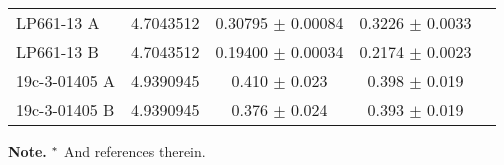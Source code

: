 \documentclass[fleqn,usenatbib]{mnras}
\begin{document}
\begin{table*}
\begin{center}
\begin{tabular}{lcccc}
LP661-13 A & 4.7043512 & 0.30795 $\pm$ 0.00084 & 0.3226 $\pm$ 0.0033 & \cite{Dittmann17} \\ %
LP661-13 B & 4.7043512 & 0.19400 $\pm$ 0.00034 & 0.2174 $\pm$ 0.0023 & \cite{Dittmann17} \\ %
19c-3-01405 A & 4.9390945 & 0.410 $\pm$ 0.023 & 0.398 $\pm$ 0.019 & \cite{Birkby12} \\ %
19c-3-01405 B & 4.9390945 & 0.376 $\pm$ 0.024 & 0.393 $\pm$ 0.019 & \cite{Birkby12} \\ %
%

\hline %
\end{tabular}
\begin{list}{}{}
\item[]{\scriptsize{{\bf Note.} $^{\rm *}$ And references therein.}}
\end{list}
\end{center}
\end{table*}






\bsp	%
\label{lastpage}
\end{document}
